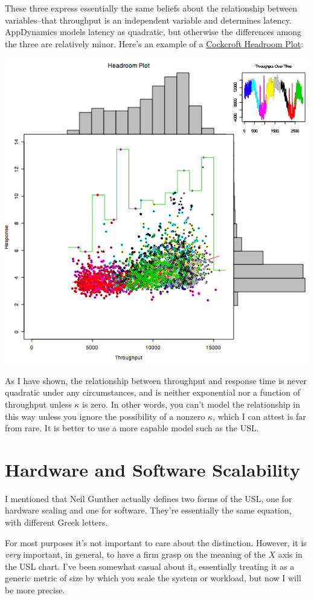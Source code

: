 \documentclass{vivid_layout}
\begin{document}
These three express essentially the same beliefs about the relationship between
variables--that throughput is an independent variable and determines latency.
AppDynamics models latency as quadratic, but otherwise
the differences among the three are relatively minor. Here's an example of a
\href{http://perfcap.blogspot.nl/2008/07/enhanced-headroom-plot-in-r.html}{Cockcroft
Headroom Plot}:
\begin{center}
\includegraphics[width=.60\linewidth]{scalability/chpblog3}
\end{center}

As I have shown, the relationship between throughput and response
time is never quadratic under any circumstances, and is neither exponential 
nor a function of throughput unless $\kappa$ is zero.
In other words, you can't model the relationship in this way unless you
ignore the possibility of a nonzero $\kappa$, which I can attest is far from
rare. It is better to use a more capable model such as the USL.

\section{Hardware and Software Scalability}

I mentioned that Neil Gunther actually defines two forms of the USL, one for
hardware scaling and one for software. They're essentially the same equation,
with different Greek letters.

For most purposes it's not important to care about the distinction. However, it
is {\itshape very} important, in general, to have a firm grasp on the meaning of
the $X$ axis in the USL chart. I've been somewhat casual about it, essentially
treating it as a generic metric of size by which you scale the system or
workload, but now I will be more precise.
\end{document}
